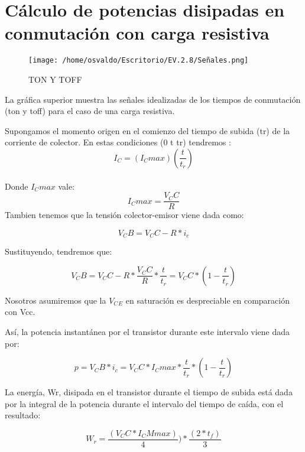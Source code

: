 \documentclass[11pt]{article}
\begin{document}
\pagebreak
\section{C\'alculo de potencias disipadas en conmutaci\'on con carga resistiva}

\begin{figure}[htp]
\centering
\texttt{[image: /home/osvaldo/Escritorio/EV.2.8/Señales.png]}
\caption{TON Y TOFF}
\label{}
\end{figure}

La gr\'afica superior muestra las se\~nales idealizadas de los tiempos de conmutaci\'on (ton y toff) para el caso de una carga resistiva.

Supongamos el momento origen en el comienzo del tiempo de subida (tr) de la corriente de colector. En estas condiciones (0 t tr) tendremos : 
\begin{equation}
I_C=(I_Cmax)(\frac{t}{t_r})
\label{1}
\end{equation}\\
Donde $I_Cmax$ vale:
\begin{equation}
 I_Cmax=\frac{V_CC}{R}
\label{2}
 \end{equation}
Tambien tenemos que la tensi\'on colector-emisor viene dada como:

\begin{equation}
 V_CB=V_CC-R*i_c
\label{3}
 \end{equation}

Sustituyendo, tendremos que:

\begin{equation}
 V_CB=V_CC-R*\frac{V_CC}{R}*\frac{t}{t_r}=V_CC*(1-\frac{t}{t_r})
\label{4}
 \end{equation}
 
 Nosotros asumiremos que la $V_C$$_E$ en saturaci\'on es despreciable en comparaci\'on con Vcc.

As\'i, la potencia instant\'anea por el transistor durante este intervalo viene dada por:

 \begin{equation}
 p=V_CB*i_c=V_CC*I_Cmax*\frac{t}{t_r}*(1-\frac{t}{t_r})
\label{5}
 \end{equation}

La energ\'ia, Wr, disipada en el transistor durante el tiempo de subida est\'a dada por la integral de la potencia durante el intervalo del tiempo de ca\'ida, con el resultado:

 \begin{equation}
 W_r=\frac{(V_CC*I_CMmax)}{4})*\frac{(2*t_f)}{3}
\label{6}
 \end{equation}
\end{document}
